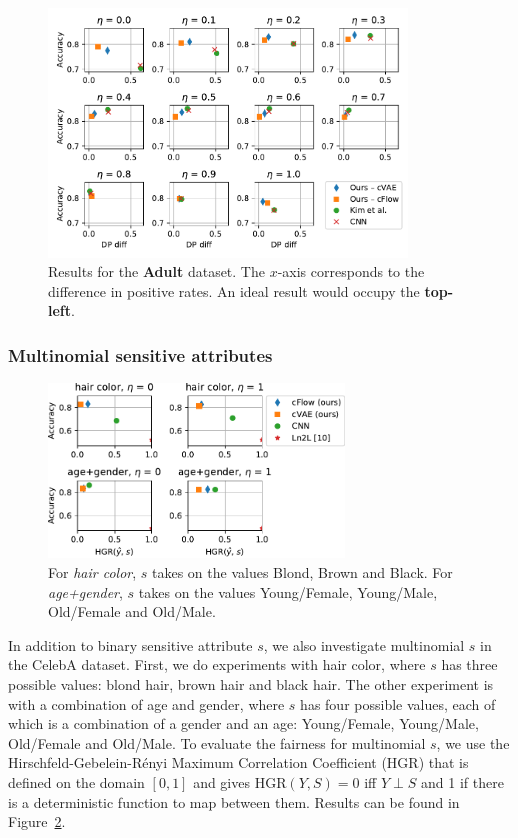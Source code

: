 \begin{figure}[htb]
  \centering
  \includegraphics[width=0.85\textwidth]{./Figures/nosinn_adult_multiplot_all_landscape_diff.pdf}
  \caption{
      Results for the \textbf{Adult} dataset.
      The $x$-axis corresponds to the difference in positive rates.
      An ideal result would occupy the \textbf{top-left}.
  }%
  \label{fig:big-adult-chart}
\end{figure}

\subsubsection{Multinomial sensitive attributes}\label{ssec:multi-s}
\begin{figure}[htb]
    \centering
    \includegraphics[width=0.7\textwidth]{Figures/celeba_multi_s.pdf}
    \caption{
        For \emph{hair color}, $s$ takes on the values Blond, Brown and Black.
        For \emph{age+gender}, $s$ takes on the values Young/Female, Young/Male, Old/Female and Old/Male.
    }%
    \label{fig:multi-s}
\end{figure}
\noindent In addition to binary sensitive attribute $s$,
we also investigate multinomial $s$ in the CelebA dataset.
First, we do experiments with hair color, where $s$ has three possible values:
blond hair, brown hair and black hair.
The other experiment is with a combination of age and gender,
where $s$ has four possible values, each of which is a combination of a gender and an age:
Young/Female, Young/Male, Old/Female and Old/Male.
To evaluate the fairness for multinomial $s$, we use the Hirschfeld-Gebelein-R\'enyi Maximum Correlation Coefficient (HGR) \cite{mary2019fairness} that is defined on the domain $[0, 1]$ and gives $\text{HGR}(Y,S)=0$ iff $Y \perp S$
and 1 if there is a deterministic function to map between them.
Results can be found in Figure~\ref{fig:multi-s}.

